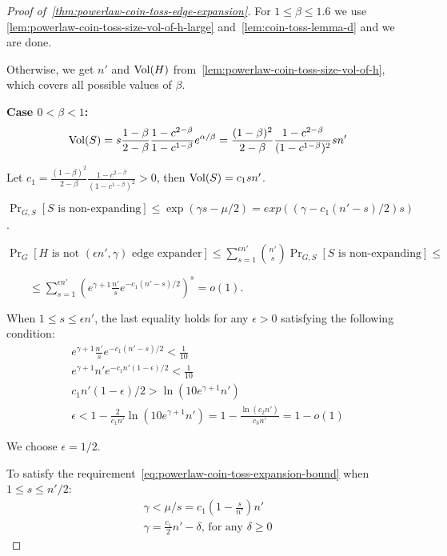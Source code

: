\begin{proof}[Proof of~\autoref{thm:powerlaw-coin-toss-edge-expansion}]
    \label{prf:powerlaw-coin-toss-edge-expansion}
    For $1\leq\beta\leq 1.6$ we use
    \autoref{lem:powerlaw-coin-toss-size-vol-of-h-large}
    and~\autoref{lem:coin-toss-lemma-d} and we are done.
    
    Otherwise, we get $n'$ and $\operatorname*{Vol}(H)$ from~\autoref{lem:powerlaw-coin-toss-size-vol-of-h},
    which covers all possible values of $\beta$.
    
    \textbf{Case $0<\beta<1$:}
    \begin{equation*}
        \operatorname*{Vol}(S)=s\frac{1-\beta}{2-\beta}\frac{1-c^{2-\beta}}{1-c^{1-\beta}}e^{\alpha/\beta}
        =\frac{(1-\beta)^2}{2-\beta}\frac{1-c^{2-\beta}}{(1-c^{1-\beta})^2}sn'
    \end{equation*}
    
    Let $c_1=\frac{(1-\beta)^2}{2-\beta}\frac{1-c^{2-\beta}}{(1-c^{1-\beta})^2}>0$,
    then $\operatorname*{Vol}(S)=c_1sn'$.
    
    $\Pr_{G,S}[S\text{ is non-expanding}]\leq\exp(\gamma s-\mu/2)
    =exp\left(\left(\gamma-c_1(n'-s)/2\right)s\right)$.
    
    $\Pr_G[H\text{ is not }(\epsilon n',\gamma)\text{ edge expander}]
    \leq\sum_{s=1}^{\epsilon n'}{\binom{n'}{s}\Pr_{G,S}[S\text{ is non-expanding}]}\leq$
    
    $\qquad\leq\sum_{s=1}^{\epsilon n'}{\left(e^{\gamma+1}\frac{n'}{s}e^{-c_1(n'-s)/2}\right)^s}=o(1)$.
    
    When $1\leq s\leq\epsilon n'$, the last equality holds for any $\epsilon>0$ satisfying the following condition:
    \begin{gather*}
        e^{\gamma+1}\frac{n'}{s}e^{-c_1(n'-s)/2}<\frac{1}{10}\\
        e^{\gamma+1}n'e^{-c_1n'(1-\epsilon)/2}<\frac{1}{10}\\
        c_1n'(1-\epsilon)/2>\ln\left(10e^{\gamma+1}n'\right)\\
        \epsilon<1-\frac{2}{c_1n'}\ln\left(10e^{\gamma+1}n'\right)
        =1-\frac{\ln(c_2n')}{c_3n'}=1-o(1)
    \end{gather*}
    
    We choose $\epsilon=1/2$.
    
    To satisfy the requirement~\eqref{eq:powerlaw-coin-toss-expansion-bound} when $1\leq s\leq n'/2$:
    \begin{gather*}
        \gamma<\mu/s=c_1(1-\frac{s}{n'})n'\\
        \gamma=\frac{c_1}{2}n'-\delta\text{, for any }\delta\geq 0
    \end{gather*}
    

\end{proof}
